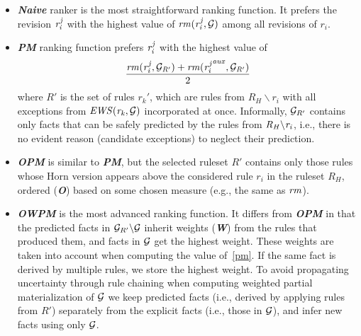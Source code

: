 \begin{itemize}
    \item {\textbf{\em Naive}} ranker is the most straightforward ranking function. It prefers the revision $\mathit{r^j_i}$ with the highest value of $\mathit{rm(r^j_{i},\mathcal{G})}$ among all revisions of $r_i$.
    \item {\textbf{\em PM}} ranking function prefers $\mathit{r^j_i}$ with the highest value of
\begin{equation}
\label{pm}
\dfrac{\mathit{rm(r^j_i,\mathcal{G}_{R'})+rm({r^j_i}^{aux},\mathcal{G}_{R'})}}{2}
\end{equation}
 where $R'$ is the set of rules $r_k'$, which are rules from $R_H\backslash r_i$ with all exceptions from $\mathit{EWS(r_k,\mathcal{G})}$ incorporated at once. Informally, $\mathcal{G}_{R'}$ contains only facts that can be safely predicted by the rules from $\mathit{R_H\backslash r_i}$, i.e., there is no evident reason (candidate exceptions) to neglect their prediction.
    \item {\textbf{\em OPM}} is similar to \textbf{{\em PM}}, but the selected ruleset $R'$ contains only those rules whose Horn version appears above the considered rule $r_i$ in the ruleset $R_H$, ordered (\textbf{\em O}) based on some chosen measure (e.g., the same as $\mathit{rm}$). %
\smallskip

    \item {\textbf{\em OWPM}} is the most advanced ranking function. It differs from \textbf{\em OPM} in that the predicted facts in $\mathcal{G}_{R'}\backslash \mathcal{G}$ inherit weights (\textbf{\em W}) from the rules that produced them, and facts in $\mathcal{G}$ get the highest weight. These weights are taken into account when computing the value of~\ref{pm}. If the same fact is derived by multiple rules, we store the highest weight. To avoid propagating uncertainty through rule chaining when computing weighted partial materialization of $\mathcal{G}$ we keep predicted facts (i.e., derived by applying rules from $R'$) separately from the explicit facts (i.e., those in $\mathcal{G}$), and infer new facts using only $\mathcal{G}$.
\end{itemize}


